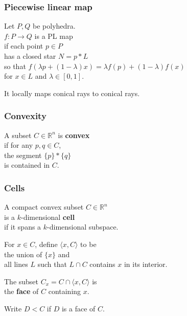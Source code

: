 \documentclass[14pt]{beamer}
\newcommand{\R}{\mathbb{R}}
\newcommand{\join}{\ast}
\begin{document}
\begin{frame}
  \frametitle{Piecewise linear map}
  Let $P, Q$ be polyhedra. \\
  $f : P \to Q$ is a PL map \\
  if each point $p \in P$ \\
  has a closed star $N = p \join L$ \\
  so that $f(\lambda p + (1-\lambda) x) = \lambda f(p) + (1 - \lambda)
  f(x)$ \\
  for $x \in L$ and $\lambda \in [0,1]$.

  \vfill

  It locally maps conical rays to conical rays.

\end{frame}

\begin{frame}
  \frametitle{Convexity}
  
  \begin{definition}
    A subset $C \in \R^n$ is \textbf{convex} \\
    if for any $p,q \in C$,\\
    the segment $\{p\} \join \{q\}$\\
    is contained in $C$.
  \end{definition}

\end{frame}

\begin{frame}
\frametitle{Cells}

 A compact convex subset $C \in \R^n$ \\
  is a $k$-dimensional \textbf{cell} \\
  if it spans a $k$-dimensional subspace.

  \vfill\pause

  For $x \in C$, define $\langle x, C \rangle$ to be \\
  the union of $\{x\}$ and \\
  all lines $L$ such that $L \cap C$ contains $x$ in its
  interior.

  \vfill\pause

  The subset $C_x = C \cap \langle x, C \rangle$ is \\
  the \textbf{face} of $C$ containing $x$.

  \vfill\pause

  Write $D < C$ if $D$ is a face  of $C$.


\end{frame}
\end{document}
